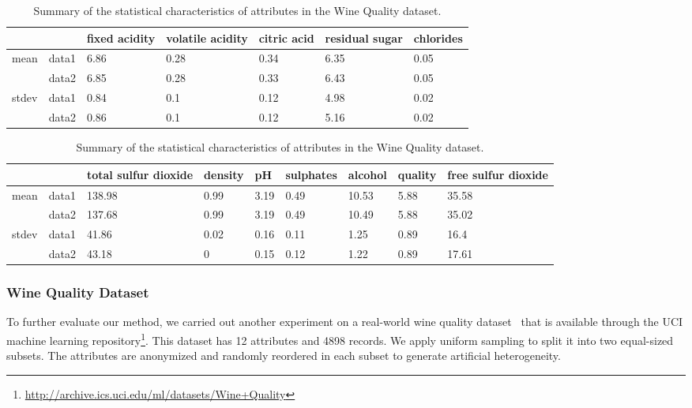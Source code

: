 \begin{table}[tbh]\footnotesize{
\begin{center}
\begin{tabular}{l|l|l|l|l|l|l}
\hline
\multicolumn{2}{c|}{}		&	fixed acidity	&	volatile acidity	&	citric acid	&	residual sugar	&	chlorides	\\
\hline
\multirow{2}{*}{mean}	&	data1	&	6.86	&	0.28	&	0.34	&	6.35	&	0.05	\\
	&	data2	&	6.85	&	0.28	&	0.33	&	6.43	&	0.05	\\
\hline
\multirow{2}{*}{stdev}	&	data1	&	0.84	&	0.1	&	0.12	&	4.98	&	0.02	\\
	&	data2	&	0.86	&	0.1	&	0.12	&	5.16	&	0.02	\\
\hline
\end{tabular}
\newline
\vspace*{.5cm}

\begin{tabular}{l|l|l|l|l|l|l|l|l}
\hline
\multicolumn{2}{c|}{}		&	total sulfur dioxide	&	density	&	pH	&	sulphates	&	alcohol	&	quality	&	free sulfur dioxide	 \\
\hline
\multirow{2}{*}{mean}	&	data1	&	138.98	&	0.99	&	3.19	&	0.49	&	10.53	&	5.88	&	35.58	\\
	&	data2	&	137.68	&	0.99	&	3.19	&	0.49	&	10.49	&	5.88	&	35.02	\\
\hline
\multirow{2}{*}{stdev}	&	data1	&	41.86	&	0.02	&	0.16	&	0.11	&	1.25	&	0.89	&	16.4	\\
	&	data2	&	43.18	&	0	&	0.15	&	0.12	&	1.22	&	0.89	&	17.61	\\
\hline
\end{tabular}
\end{center}}
\caption[Distribution of the Wine Quality dataset]{\label{tbl:wine_stat} Summary of the statistical characteristics of attributes in the Wine Quality dataset.}
\end{table}

\subsubsection{Wine Quality Dataset}
To further evaluate our method, we carried out another experiment on a real-world wine quality dataset~\cite{CorCer09} that is available through the UCI machine learning repository\footnote[1]{\url{http://archive.ics.uci.edu/ml/datasets/Wine+Quality}}. This dataset has 12 attributes and 4898 records. We apply uniform sampling to split it into two equal-sized subsets. The attributes are anonymized and randomly reordered in each subset to generate artificial heterogeneity.

